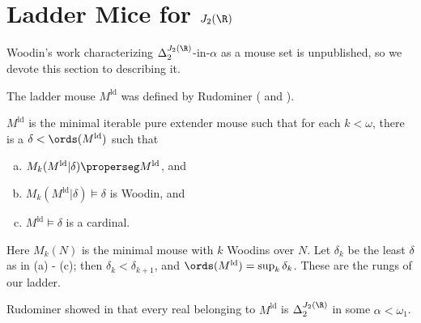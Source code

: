 \documentclass[oneside,12pt]{amsart}
\begin{document}
\section{Ladder Mice for $J_2(\R)$}

Woodin's work characterizing $\Delta_2^{J_2(\R)}$-in-$\alpha$ as a mouse set is
unpublished, so we devote this section to describing it.

The ladder mouse $M^{\text{ld}}$ was defined by Rudominer
(\cite{My_Thesis} and \cite{Mouse_Sets} ).

\begin{definition}
$M^{\text{ld}}$ is the minimal iterable pure extender mouse such that for each $k<\omega$,
 there is a $\delta<\ords(M^{\text{ld}})$ such that
\begin{enumerate}[(a)]
\item $M_k(M^{\text{ld}} \vert \delta) \properseg M^{\text{ld}} $, and
\item $M_k(M^{\text{ld}} \vert \delta) \models \delta$ is Woodin, and
\item $M^{\text{ld}} \models \delta$ is a cardinal.
\end{enumerate}

Here $M_k(N)$ is the minimal mouse with $k$ Woodins over $N$. Let $\delta_k$
be the least $\delta$ as in (a) - (c); then $\delta_k<\delta_{k+1}$, and
$\ords(M^{\text{ld}}) = \sup_k \delta_k$. These are the rungs of our ladder.

\end{definition}

Rudominer showed in \cite{My_Thesis} that every real belonging to
$M^{\text{ld}}$ is $\Delta_2^{J_2(\R)}$ in some $\alpha<\omega_1$.




\end{document}
